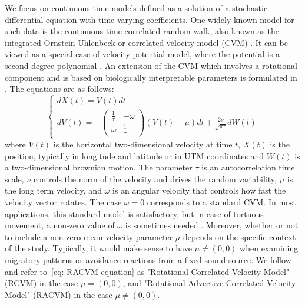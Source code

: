 \documentclass[11pt]{article}
\newcommand {\1}{\mathbb{1}}
\theoremstyle{definition}
\theoremstyle{remark}
\theoremstyle{remark}
\begin{document}
We focus on continuous-time models defined as a solution of a stochastic differential equation with time-varying coefficients. One widely known model for such data is the continuous-time correlated random walk, also known as the integrated Ornstein-Uhlenbeck or correlated velocity model (CVM) \cite{johnson_continuoustime_2008}. It can be viewed as a special case of velocity potential model, where the potential is a second degree polynomial \cite{preisler_analyzing_2013}. An extension of the CVM which involves a rotational component and is based on biologically interpretable parameters is formulated in  \cite{gurarie_correlated_2017}. The equations are as follows:
\begin{equation} \left\{
	\begin{array}{l}
		dX(t)=V(t)dt \\
		dV(t)=-\begin{pmatrix} 
			\frac{1}{\tau} & -\omega \\
			\omega & \frac{1}{\tau}
		\end{pmatrix}(V(t)-\mu)dt+\frac{2\nu}{\sqrt{\pi \tau}} dW(t) 
	\end{array}
	\right.
	\label{eq: RACVM equation}
\end{equation}
where $V(t)$ is the horizontal two-dimensional velocity at time $t$, $X(t)$ is the position, typically in longitude and latitude or in UTM coordinates and $W(t)$ is a two-dimensional brownian motion. 
The parameter $\tau$ is an autocorrelation time scale, $\nu$ controls the norm of the velocity and drives the random variability, $\mu$ is the long term velocity, and $\omega$ is an angular velocity that controls how fast the velocity vector rotates. The case $\omega=0$ corresponds to a standard CVM. In most applications, this standard model is satisfactory, but in case of tortuous movement, a non-zero value of $\omega$ is sometimes needed \cite{gurarie_correlated_2017,alt_correlation_1990,albertsen_generalizing_2018}. Moreover, whether or not to include a non-zero mean velocity parameter $\mu$ depends on the specific context of the study. Typically, it would make sense to have $\mu\neq (0,0)$ when examining migratory patterns or avoidance reactions from a fixed sound source. We follow \cite{gurarie_correlated_2017} and refer to~\eqref{eq: RACVM equation} as "Rotational Correlated Velocity Model" (RCVM) in the case $\mu=(0,0)$, and "Rotational Advective Correlated Velocity Model" (RACVM) in the case $\mu \neq (0,0)$.\\
\end{document}
